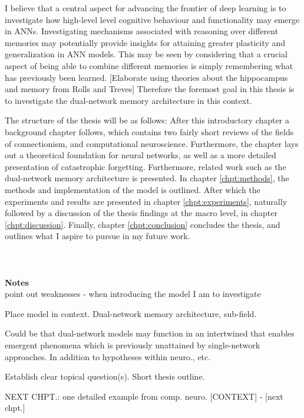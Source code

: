 I believe that a central aspect for advancing the frontier of deep learning is to investigate how high-level level cognitive behaviour and functionality may emerge in ANNs. Investigating mechanisms associated with reasoning over different memories may potentially provide insights for attaining greater plasticity and generalization in ANN models. This may be seen by considering that a crucial aspect of being able to combine different memories is simply remembering what has previously been learned. [Elaborate using theories about the hippocampus and memory from Rolls and Treves] Therefore the foremost goal in this thesis is to investigate the dual-network memory architecture in this context.

The structure of the thesis will be as follows: After this introductory chapter a background chapter follows, which contains two fairly short reviews of the fields of connectionism, and computational neuroscience. Furthermore, the chapter lays out a theoretical foundation for neural networks, as well as a more detailed presentation of catastrophic forgetting. Furthermore, related work such as the dual-network memory architecture is presented. In chapter \ref{chpt:methods}, the methods and implementation of the model is outlined. After which the experiments and results are presented in chapter \ref{chpt:experiments}, naturally followed by a discussion of the thesis findings at the macro level, in chapter \ref{chpt:discussion}. Finally, chapter \ref{chpt:conclusion} concludes the thesis, and outlines what I aspire to pursue in my future work.
\\\\\\\\


\textbf{Notes}
\\

point out weaknesses - when introducing the model I am to investigate

Place model in context.
Dual-network memory architecture, sub-field.

Could be that dual-network models may function in an intertwined that enables emergent phenomena which is previously unattained by single-network approaches. In addition to hypotheses within neuro., etc.

Establish clear topical question(s).
Short thesis outline.


NEXT CHPT.:
one detailed example from comp. neuro. [CONTEXT] - [next chpt.]

\cleardoublepage